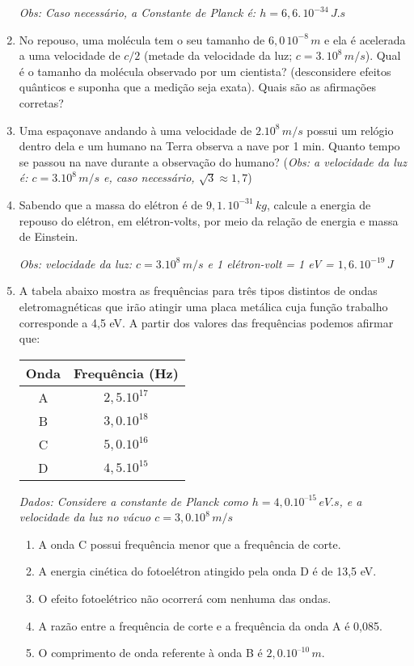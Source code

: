 \documentclass[12pt,letterpaper,fleqn]{article}
\begin{document}
\begin{enumerate}
\textit{Obs: Caso necessário, a Constante de Planck é: $h=6,6.\,10^{-34}\,J.s$}

\item No repouso, uma molécula tem o seu tamanho de $6,0\,10^{-8}\,m$ e ela é acelerada a uma velocidade de $c/2$ (metade da velocidade da luz; $c=3.\,10^{8}\,m/s$). Qual é o tamanho da molécula observado por um cientista? (desconsidere efeitos quânticos e suponha que a medição seja exata).
Quais são as afirmações corretas?

\item Uma espaçonave andando à uma velocidade de $2.10^{8}\,m/s$ possui um relógio dentro dela e um humano na Terra observa a nave por 1 min. Quanto tempo se passou na nave durante a observação do humano? (\textit{Obs: a velocidade da luz é: $c=3.10^8\,m/s$ e, caso necessário, $\sqrt{3}\approx 1,7$})

\item Sabendo que a massa do elétron é de $9,1.\,10^{-31}\,kg$, calcule a energia de repouso do elétron, em elétron-volts, por meio da relação de energia e massa de Einstein.

\textit{Obs: velocidade da luz: $c=3.10^8\,m/s$ e 1 elétron-volt = 1 eV = $1,6.\,10^{-19}\,J$}

\item A tabela abaixo mostra as frequências para três tipos distintos de ondas eletromagnéticas que irão atingir uma placa metálica cuja função trabalho corresponde a 4,5 eV. A partir dos valores das frequências podemos afirmar que:
\begin{table}[H]
    \centering
    \begin{tabular}{|c|c|}
    \hline
         \textbf{Onda} & \textbf{Frequência (Hz)}  \\
         \hline
         A & $2,5.10^{17}$\\
         \hline
         B & $3,0.10^{18}$\\
         \hline
         C & $5,0.10^{16}$\\
         \hline
         D & $4,5.10^{15}$\\
         \hline
    \end{tabular}
    \label{tab:my_label}
\end{table}
\textit{Dados: Considere a constante de Planck como $h = 4,0.10^{–15}\,eV.s$, e a velocidade da luz no vácuo $c = 3,0.10^8\,m/s$}

\begin{enumerate}
    \item A onda C possui frequência menor que a frequência de corte.
    \item A energia cinética do fotoelétron atingido pela onda D é de 13,5 eV.
    \item O efeito fotoelétrico não ocorrerá com nenhuma das ondas.
    \item A razão entre a frequência de corte e a frequência da onda A é 0,085.
    \item O comprimento de onda referente à onda B é $2,0.10 ^{–10}\,m$.
\end{enumerate}


\end{enumerate}
\end{document}
